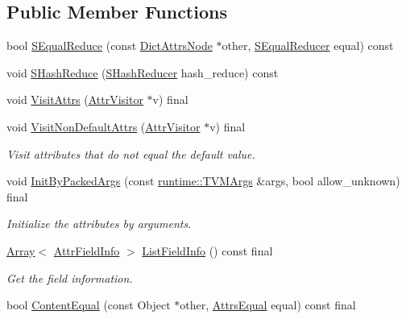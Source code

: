 \subsection*{Public Member Functions}
\begin{DoxyCompactItemize}
\item 
bool \hyperlink{classtvm_1_1DictAttrsNode_ae0218d9d2bea5d4244bfbfc7a3635d35}{S\+Equal\+Reduce} (const \hyperlink{classtvm_1_1DictAttrsNode}{Dict\+Attrs\+Node} $\ast$other, \hyperlink{classtvm_1_1SEqualReducer}{S\+Equal\+Reducer} equal) const 
\item 
void \hyperlink{classtvm_1_1DictAttrsNode_a9b325fbc574606d832cca3b483bac572}{S\+Hash\+Reduce} (\hyperlink{classtvm_1_1SHashReducer}{S\+Hash\+Reducer} hash\+\_\+reduce) const 
\item 
void \hyperlink{classtvm_1_1DictAttrsNode_a8866b613e11f531ec6db5834bb1d15ef}{Visit\+Attrs} (\hyperlink{classtvm_1_1AttrVisitor}{Attr\+Visitor} $\ast$v) final
\item 
void \hyperlink{classtvm_1_1DictAttrsNode_ac096af14759a1d48ecf78fd6545776e0}{Visit\+Non\+Default\+Attrs} (\hyperlink{classtvm_1_1AttrVisitor}{Attr\+Visitor} $\ast$v) final
\begin{DoxyCompactList}\small\item\em Visit attributes that do not equal the default value. \end{DoxyCompactList}\item 
void \hyperlink{classtvm_1_1DictAttrsNode_a06f561f072ccdd91c5c791b26331cc2f}{Init\+By\+Packed\+Args} (const \hyperlink{classtvm_1_1runtime_1_1TVMArgs}{runtime\+::\+T\+V\+M\+Args} \&args, bool allow\+\_\+unknown) final
\begin{DoxyCompactList}\small\item\em Initialize the attributes by arguments. \end{DoxyCompactList}\item 
\hyperlink{classtvm_1_1Array}{Array}$<$ \hyperlink{classtvm_1_1AttrFieldInfo}{Attr\+Field\+Info} $>$ \hyperlink{classtvm_1_1DictAttrsNode_ab0cbd903adcee206626a192f008ca1e7}{List\+Field\+Info} () const final
\begin{DoxyCompactList}\small\item\em Get the field information. \end{DoxyCompactList}\item 
bool \hyperlink{classtvm_1_1DictAttrsNode_ae698075fc46d508c9d7f4196c7edc02b}{Content\+Equal} (const Object $\ast$other, \hyperlink{classtvm_1_1AttrsEqual}{Attrs\+Equal} equal) const final

\end{DoxyCompactItemize}
